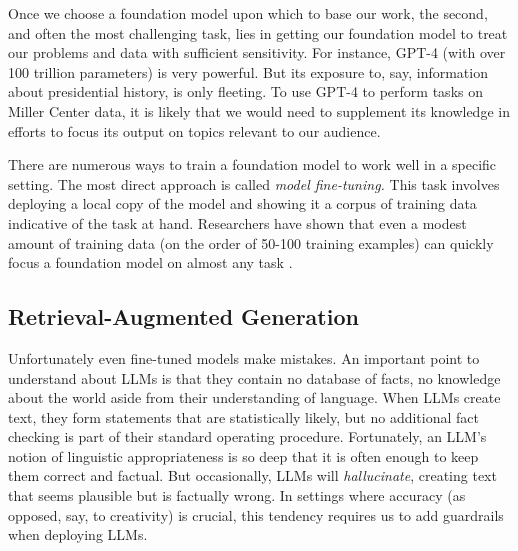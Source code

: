 \documentclass[12pt, oneside]{article}   	%
\begin{document}
Once we choose a foundation model upon which to base our work, the second, and often the most challenging task, lies in getting our foundation model to treat our problems and data with sufficient sensitivity.  For instance, GPT-4 (with over 100 trillion parameters) is very powerful.  But its exposure to, say, information about presidential history, is only fleeting.  To use GPT-4 to perform tasks on Miller Center data, it is likely that we would need to supplement its knowledge in efforts to focus its output on topics relevant to our audience.

There are numerous ways to train a foundation model to work well in a specific setting.  The most direct approach is called \emph{model fine-tuning.}  This task involves deploying a local copy of the model and showing it a corpus of training data indicative of the task at hand.  Researchers have shown that even a modest amount of training data (on the order of 50-100 training examples) can quickly focus a foundation model on almost any task \cite{liu:2022}.

\subsection{Retrieval-Augmented Generation}\label{section.definitions.rag}
Unfortunately even fine-tuned models make mistakes.  An important point to understand about LLMs is that they contain no database of facts, no knowledge about the world aside from their understanding of language.  When LLMs create text, they form statements that are statistically likely, but no additional fact checking is part of their standard operating procedure.  Fortunately, an LLM's notion of linguistic appropriateness is so deep that it is often enough to keep them correct and factual.  But occasionally, LLMs will \emph{hallucinate}, creating text that seems plausible but is factually wrong.  In settings where accuracy (as opposed, say, to creativity) is crucial, this tendency requires us to add guardrails when deploying LLMs.
\end{document}
